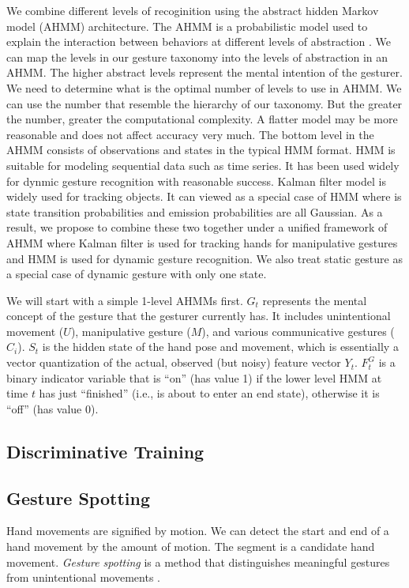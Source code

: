 We combine different levels of recoginition using the abstract hidden Markov
model (AHMM) architecture. The AHMM is a probabilistic model used to explain the
interaction between behaviors at different levels of abstraction \cite{johns05}.
We can map the levels in our gesture taxonomy into the levels of abstraction in
an AHMM. The higher abstract levels represent the mental intention of the
gesturer. We need to determine what is the optimal number of levels to use in
AHMM. We can use the number that resemble the hierarchy of our taxonomy. But the
greater the number, greater the computational complexity. A flatter model may be
more reasonable and does not affect accuracy very much. The bottom level in the
AHMM consists of observations and states in the typical HMM format. HMM is suitable for modeling sequential data such as time 
series. It has been used widely for dynmic gesture recognition with reasonable 
success. Kalman filter model is widely used for tracking objects. It can viewed 
as a special case of HMM where is state transition probabilities and emission 
probabilities are all Gaussian. As a result, we propose to combine these two 
together under a unified framework of AHMM where Kalman filter is used for 
tracking hands for manipulative gestures and HMM is used for dynamic gesture 
recognition. We also treat static gesture as a special case of dynamic gesture 
with only one state.

We will start with a simple 1-level AHMMs \cite{murphy02} first. $G_t$ represents the
mental concept of the gesture that the gesturer currently has. It includes
unintentional movement ($U$), manipulative gesture ($M$), and various
communicative gestures ($C_i$). $S_t$ is the hidden state of the hand pose and
movement, which is essentially a vector quantization of the actual, observed 
(but noisy) feature vector $Y_t$. $F_t^G$ is a binary indicator variable that is
``on'' (has value 1) if the lower level HMM at time $t$ has just ``finished''
(i.e., is about to enter an end state), otherwise it is ``off'' (has value 0).

\subsection{Discriminative Training}

\subsection{Gesture Spotting}
Hand movements are signified by motion. We can detect the start
and end of a hand movement by the amount of motion. The segment is a candidate
hand movement. \textit{Gesture spotting} is a method that distinguishes
meaningful gestures from unintentional movements \cite{kang04}.

